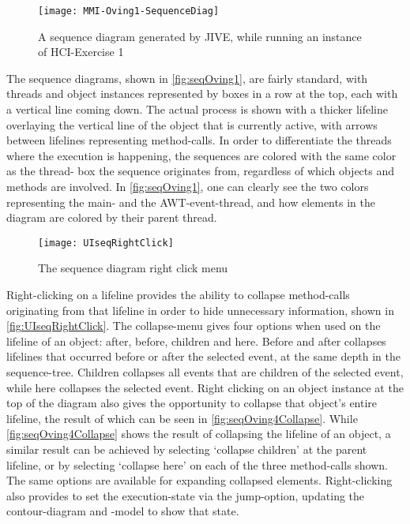 \begin{figure}[H]
	\centering
	\texttt{[image: MMI-Oving1-SequenceDiag]}
	\caption{A sequence diagram generated by JIVE, while running an instance of HCI-Exercise 1}
	\label{fig:seqOving1}
\end{figure}
The sequence diagrams, shown in \autoref{fig:seqOving1}, are fairly standard, with threads and object instances represented by boxes in a row at the top, each with a vertical line coming down.
The actual process is shown with a thicker lifeline overlaying the vertical line of the object that is currently active, with arrows between lifelines representing method-calls.
In order to differentiate the threads where the execution is happening, the sequences are colored with the same color as the thread- box the sequence originates from, regardless of which objects and methods are involved.
In \autoref{fig:seqOving1}, one can clearly see the two colors representing the main- and the AWT-event-thread, and how elements in the diagram are colored by their parent thread.
\begin{figure}[H]
	\centering
	\texttt{[image: UIseqRightClick]}
	\caption{The sequence diagram right click menu}
	\label{fig:UIseqRightClick}
\end{figure}
Right-clicking on a lifeline provides the ability to collapse method-calls originating from that lifeline in order to hide unnecessary information, shown in \autoref{fig:UIseqRightClick}.
The collapse-menu gives four options when used on the lifeline of an object: after, before, children and here.
Before and after collapses lifelines that occurred before or after the selected event, at the same depth in the sequence-tree.
Children collapses all events that are children of the selected event, while here collapses the selected event.
Right clicking on an object instance at the top of the diagram also gives the opportunity to collapse that object's entire lifeline, the result of which can be seen in \autoref{fig:seqOving4Collapse}.
While \autoref{fig:seqOving4Collapse} shows the result of collapsing the lifeline of an object, a similar result can be achieved by selecting `collapse children' at the parent lifeline, or by selecting `collapse here' on each of the three method-calls shown.
The same options are available for expanding collapsed elements.
Right-clicking also provides to set the execution-state via the jump-option, updating the contour-diagram and -model to show that state.


